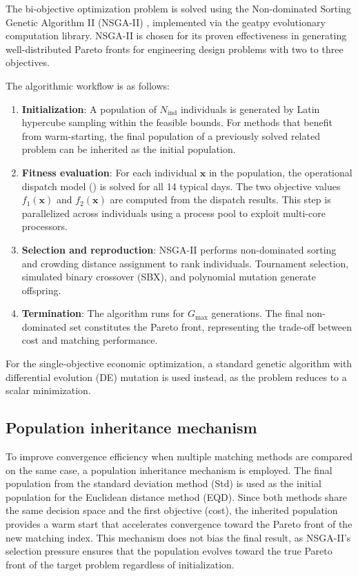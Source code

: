 The bi-objective optimization problem is solved using the Non-dominated Sorting Genetic Algorithm II (NSGA-II) \cite{deb2002fast}, implemented via the geatpy evolutionary computation library. NSGA-II is chosen for its proven effectiveness in generating well-distributed Pareto fronts for engineering design problems with two to three objectives.

The algorithmic workflow is as follows:

\begin{enumerate}
    \item \textbf{Initialization}: A population of $N_{\text{ind}}$ individuals is generated by Latin hypercube sampling within the feasible bounds. For methods that benefit from warm-starting, the final population of a previously solved related problem can be inherited as the initial population.
    \item \textbf{Fitness evaluation}: For each individual $\mathbf{x}$ in the population, the operational dispatch model () is solved for all 14 typical days. The two objective values $f_1(\mathbf{x})$ and $f_2(\mathbf{x})$ are computed from the dispatch results. This step is parallelized across individuals using a process pool to exploit multi-core processors.
    \item \textbf{Selection and reproduction}: NSGA-II performs non-dominated sorting and crowding distance assignment to rank individuals. Tournament selection, simulated binary crossover (SBX), and polynomial mutation generate offspring.
    \item \textbf{Termination}: The algorithm runs for $G_{\text{max}}$ generations. The final non-dominated set constitutes the Pareto front, representing the trade-off between cost and matching performance.
\end{enumerate}

For the single-objective economic optimization, a standard genetic algorithm with differential evolution (DE) mutation is used instead, as the problem reduces to a scalar minimization.

\subsection{Population inheritance mechanism}
\label{sec:inheritance}

To improve convergence efficiency when multiple matching methods are compared on the same case, a population inheritance mechanism is employed. The final population from the standard deviation method (Std) is used as the initial population for the Euclidean distance method (EQD). Since both methods share the same decision space and the first objective (cost), the inherited population provides a warm start that accelerates convergence toward the Pareto front of the new matching index. This mechanism does not bias the final result, as NSGA-II's selection pressure ensures that the population evolves toward the true Pareto front of the target problem regardless of initialization.

